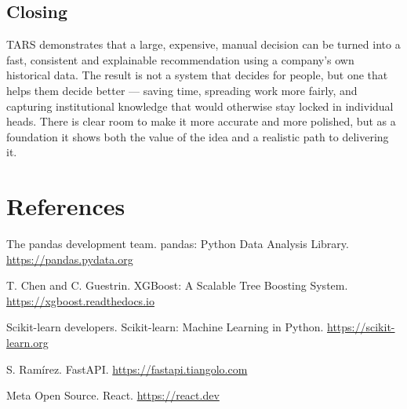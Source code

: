 \documentclass[9pt,a4paper,twoside]{utils/tau-class/tau}
\begin{document}
\subsection{Closing}

TARS demonstrates that a large, expensive, manual decision can be turned into a fast, consistent and explainable recommendation using a company's own historical data. The result is not a system that decides for people, but one that helps them decide better --- saving time, spreading work more fairly, and capturing institutional knowledge that would otherwise stay locked in individual heads. There is clear room to make it more accurate and more polished, but as a foundation it shows both the value of the idea and a realistic path to delivering it.

\section*{References}

\begin{enumerate}[label={[\arabic*]},leftmargin=*]
    \item The pandas development team. pandas: Python Data Analysis Library. \url{https://pandas.pydata.org}
    \item T. Chen and C. Guestrin. XGBoost: A Scalable Tree Boosting System. \url{https://xgboost.readthedocs.io}
    \item Scikit-learn developers. Scikit-learn: Machine Learning in Python. \url{https://scikit-learn.org}
    \item S. Ram\'irez. FastAPI. \url{https://fastapi.tiangolo.com}
    \item Meta Open Source. React. \url{https://react.dev}
\end{enumerate}

\end{document}
